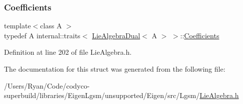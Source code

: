 \subsubsection{\texorpdfstring{Coefficients}{Coefficients}}
{\footnotesize\ttfamily template$<$class A $>$ \\
typedef A internal\+::traits$<$ \hyperlink{class_lie_algebra_dual}{Lie\+Algebra\+Dual}$<$ A $>$ $>$\+::\hyperlink{structinternal_1_1traits_3_01_lie_algebra_dual_3_01_a_01_4_01_4_a1272ac68a65e84810584f5a54eabe4bc}{Coefficients}}



Definition at line 202 of file Lie\+Algebra.\+h.



The documentation for this struct was generated from the following file\+:\begin{DoxyCompactItemize}
\item 
/\+Users/\+Ryan/\+Code/codyco-\/superbuild/libraries/\+Eigen\+Lgsm/unsupported/\+Eigen/src/\+Lgsm/\hyperlink{_lie_algebra_8h}{Lie\+Algebra.\+h}\end{DoxyCompactItemize}
